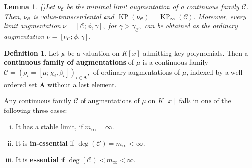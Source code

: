 \documentclass[11pt]{amsart}
\newtheorem{lemma}[theorem]{Lemma}
\theoremstyle{definition}
\newtheorem{definition}[theorem]{Definition}
\theoremstyle{remark}
\numberwithin{equation}{section}
\begin{document}
\begin{lemma}(\cite[Section 7.3.3]{Ma2})\label{vt1}
Let $\nu_{\mathcal{C}}$ be the minimal limit augmentation of a continuous family $\mathcal{C}$. Then, $\nu_{\mathcal{C}}$ is value-transcendental and $\operatorname{KP}(\nu_{\mathcal{C}})=\operatorname{KP}_{\infty}(\mathcal{C}).$ Moreover, every limit augmentation $\nu=[\mathcal{C};\phi,\gamma],$ for $\gamma>\gamma_{\mathcal{C}},$ can be obtained as the ordinary augmentation $\nu=[\nu_{\mathcal{C}};\phi,\gamma].$ 
\end{lemma}

\begin{definition}\label{1.1.14}
	Let $\mu$ be a valuation on $K[x]$ admitting key polynomials. Then a {\bf continuous family of augmentations} of $\mu$ is a continuous family $\mathcal{C} =(\rho_i=[\mu;\chi_i,\beta_i])_{i\in\mathbf{A}},$ of ordinary augmentations of $\mu$,  indexed by a well-ordered set $\mathbf{A}$ without a last element.
	\end{definition}
	

Any continuous family $\mathcal{C}$ of augmentations of $\mu$ on $K[x]$ falls in one of the following three cases:
\begin{enumerate}[(i)]
	\item  It has a stable limit, if $m_{\infty}=\infty.$ 
	\item It is {\bf in-essential} if $\deg(\mathcal{C})=m_{\infty}<\infty.$
	\item It is  {\bf essential }  if $\deg(\mathcal{C})<m_{\infty}<\infty.$
\end{enumerate} 
\end{document}
